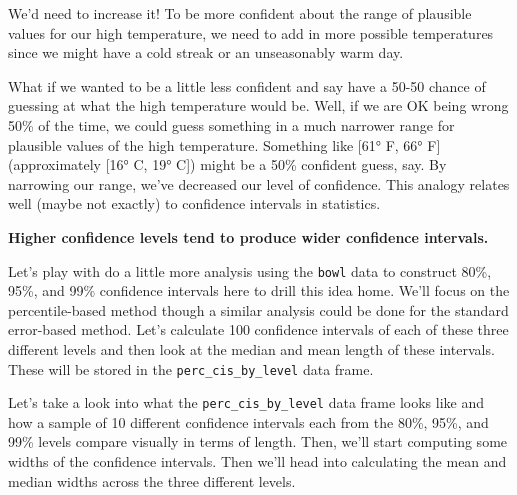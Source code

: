 \documentclass[12pt, krantz2,]{krantz}
\begin{document}
We'd need to increase it! To be more confident about the range of plausible values for our high temperature, we need to add in more possible temperatures since we might have a cold streak or an unseasonably warm day.

What if we wanted to be a little less confident and say have a 50-50 chance of guessing at what the high temperature would be. Well, if we are OK being wrong 50\% of the time, we could guess something in a much narrower range for plausible values of the high temperature. Something like {[}61° F, 66° F{]} (approximately {[}16° C, 19° C{]}) might be a 50\% confident guess, say. By narrowing our range, we've decreased our level of confidence. This analogy relates well (maybe not exactly) to confidence intervals in statistics.

\textbf{Higher confidence levels tend to produce wider confidence intervals.}

Let's play with do a little more analysis using the \texttt{bowl} data to construct 80\%, 95\%, and 99\% confidence intervals here to drill this idea home. We'll focus on the percentile-based method though a similar analysis could be done for the standard error-based method. Let's calculate 100 confidence intervals of each of these three different levels and then look at the median and mean length of these intervals. These will be stored in the \texttt{perc\_cis\_by\_level} data frame.

Let's take a look into what the \texttt{perc\_cis\_by\_level} data frame looks like and how a sample of 10 different confidence intervals each from the 80\%, 95\%, and 99\% levels compare visually in terms of length. Then, we'll start computing some widths of the confidence intervals. Then we'll head into calculating the mean and median widths across the three different levels.

\begingroup\fontsize{10}{12}\selectfont
\end{document}
